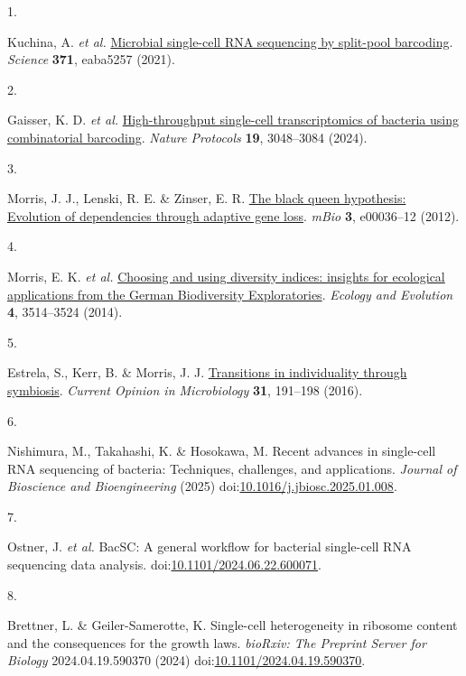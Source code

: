\documentclass[
  11pt,
  a4paper,
]{report}
\newlength{\cslhangindent}
\newlength{\csllabelwidth}
\newenvironment{CSLReferences}[2] %
 {\begin{list}{}{%
  \setlength{\itemindent}{0pt}
  \setlength{\leftmargin}{0pt}
  \setlength{\parsep}{0pt}
  \ifodd #1
   \setlength{\leftmargin}{\cslhangindent}
   \setlength{\itemindent}{-1\cslhangindent}
  \fi
  \setlength{\itemsep}{#2\baselineskip}}}
 {\end{list}}
\newcommand{\CSLLeftMargin}[1]{\parbox[t]{\csllabelwidth}{\strut#1\strut}}
\newcommand{\CSLRightInline}[1]{\parbox[t]{\linewidth - \csllabelwidth}{\strut#1\strut}}
\begin{document}
\label{refs}
\begin{CSLReferences}{0}{0}
\CSLLeftMargin{1. }%
\CSLRightInline{Kuchina, A. \emph{et al.}
\href{https://doi.org/10.1126/science.aba5257}{Microbial single-cell RNA
sequencing by split-pool barcoding}. \emph{Science} \textbf{371},
eaba5257 (2021).}

\CSLLeftMargin{2. }%
\CSLRightInline{Gaisser, K. D. \emph{et al.}
\href{https://doi.org/10.1038/s41596-024-01007-w}{High-throughput
single-cell transcriptomics of bacteria using combinatorial barcoding}.
\emph{Nature Protocols} \textbf{19}, 3048--3084 (2024).}

\CSLLeftMargin{3. }%
\CSLRightInline{Morris, J. J., Lenski, R. E. \& Zinser, E. R.
\href{https://doi.org/10.1128/mBio.00036-12}{The black queen hypothesis:
Evolution of dependencies through adaptive gene loss}. \emph{mBio}
\textbf{3}, e00036--12 (2012).}

\CSLLeftMargin{4. }%
\CSLRightInline{Morris, E. K. \emph{et al.}
\href{https://doi.org/10.1002/ece3.1155}{Choosing and using diversity
indices: insights for ecological applications from the German
Biodiversity Exploratories}. \emph{Ecology and Evolution} \textbf{4},
3514--3524 (2014).}

\CSLLeftMargin{5. }%
\CSLRightInline{Estrela, S., Kerr, B. \& Morris, J. J.
\href{https://doi.org/10.1016/j.mib.2016.04.007}{Transitions in
individuality through symbiosis}. \emph{Current Opinion in Microbiology}
\textbf{31}, 191--198 (2016).}

\CSLLeftMargin{6. }%
\CSLRightInline{Nishimura, M., Takahashi, K. \& Hosokawa, M. Recent
advances in single-cell RNA sequencing of bacteria: Techniques,
challenges, and applications. \emph{Journal of Bioscience and
Bioengineering} (2025)
doi:\href{https://doi.org/10.1016/j.jbiosc.2025.01.008}{10.1016/j.jbiosc.2025.01.008}.}

\CSLLeftMargin{7. }%
\CSLRightInline{Ostner, J. \emph{et al.} BacSC: A general workflow for
bacterial single-cell RNA sequencing data analysis.
doi:\href{https://doi.org/10.1101/2024.06.22.600071}{10.1101/2024.06.22.600071}.}

\CSLLeftMargin{8. }%
\CSLRightInline{Brettner, L. \& Geiler-Samerotte, K. Single-cell
heterogeneity in ribosome content and the consequences for the growth
laws. \emph{bioRxiv: The Preprint Server for Biology} 2024.04.19.590370
(2024)
doi:\href{https://doi.org/10.1101/2024.04.19.590370}{10.1101/2024.04.19.590370}.}


\end{CSLReferences}
\end{document}
